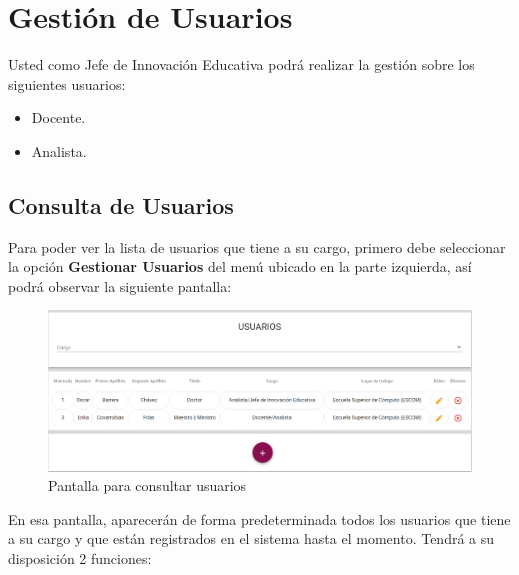 
\chapter{Gestión de Usuarios}
    
    Usted como Jefe de Innovación Educativa podrá realizar la gestión sobre los siguientes usuarios:
    \begin{itemize}
        \item Docente.
        \item Analista.
    \end{itemize}
    

    \section{Consulta de Usuarios}
        
        Para poder ver la lista de usuarios que tiene a su cargo, primero debe seleccionar la opción \textbf{Gestionar Usuarios} del menú ubicado en la parte izquierda, así podrá observar la siguiente pantalla:
        
        \begin{figure}[!hbtp]
            \centering
            \hypertarget{consultarUs}{\includegraphics[width=0.7\linewidth]{images/SP5/Consultar-Usuario}}
            \caption{Pantalla para consultar usuarios}
            \label{consultarrh}
        \end{figure}
        
        En esa pantalla, aparecerán de forma predeterminada todos los usuarios que tiene a su cargo y que están registrados en el sistema hasta el momento. Tendrá a su disposición 2 funciones:
        
